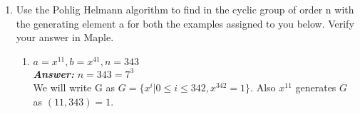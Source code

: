 \documentclass[11pt,a4paper,fleqn]{article}
\makeatletter
\newcommand{\tpmod}[1]{{\@displayfalse\pmod{#1}}}
\newcommand\Tstrut{\rule{0pt}{2.6ex}}         %
\makeatother
\begin{document}
\begin{enumerate}[1.]
\begin{flushleft}
\begin{enumerate}
\begin{enumerate}[Step 1.]
\begin{table}[H]
{\begin{tabular}{|l|l|}
						\hline
						8 & $24.26^{-8} = 24.26^{44} = 49$ \Tstrut\\
						\hline
					\end{tabular}
					\caption{Step 3}}
			\end{table}
			\item We found a collision in both the tables for $value = 49$ where $i = 8$ and $mj = 8 \times 3$
			\item We calculate $t = (mj + i)\tpmod{53} = (8 \times 3 + 8)\tpmod{53} \equiv 32\tpmod{53}$\\
			$\implies 26^{32} \equiv 24\tpmod{53}$
			\item Verifying the answer using Fast Modular Exponentiation:
			\begin{align*}
				& 26^2 \equiv 40\tpmod{53} \\
				& \therefore 26^4 = (26^2)^2 = 40^2 \equiv 10\tpmod{53} \\
				& \implies 26^{16} = (26^4)^4 = 10^4 \equiv 36\tpmod{53} \\
				& \implies 26^{32} = (26^{16})^2 = 36^2 \equiv 24\tpmod{53} \text{ and hence the answer}
			\end{align*}
		\end{enumerate}	
		\end{enumerate}
		\end{flushleft}
		\item Use the Pohlig Helmann algorithm to find in the cyclic group of order n with the generating element a for both the examples assigned to you below. Verify your answer in Maple.
		\begin{flushleft}
			\begin{enumerate}
				\item $a = x^{11}, b = x^{41}, n = 343$ \\ \bigbreak
				\textbf{\textit{Answer:}} $n = 343 = 7^3$\\
				We will write G as $G = \{x^i | 0 \le i \le 342, x^{342} = 1\}$. Also $x^{11}$ generates $G$ as $(11, 343) = 1$.\\
				

\end{enumerate}
\end{flushleft}
\end{enumerate}
\end{document}
